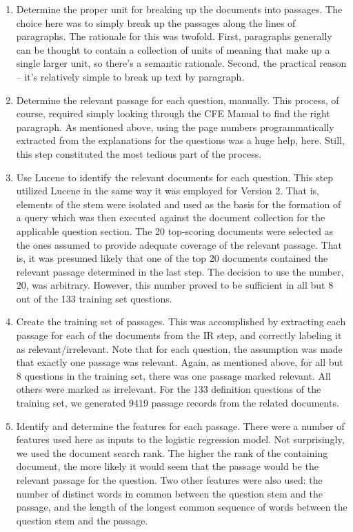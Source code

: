 \begin{enumerate}
\item Determine the proper unit for breaking up the documents into passages.  The choice here was to simply break up the passages along the lines of paragraphs.  The rationale for this was twofold.  First, paragraphs generally can be thought to contain a collection of units of meaning that make up a single larger unit, so there's a semantic rationale.  Second, the practical reason -- it's relatively simple to break up text by paragraph.

\item Determine the relevant passage for each question, manually.  This process, of course, required simply looking through the CFE Manual to find the right paragraph.  As mentioned above, using the page numbers programmatically extracted from the explanations for the questions was a huge help, here.  Still, this step constituted the most tedious part of the process.

\item Use Lucene to identify the relevant documents for each question.  This step utilized Lucene in the same way it was employed for Version 2.  That is, elements of the stem were isolated and used as the basis for the formation of a query which was then executed against the document collection for the applicable question section.  The 20 top-scoring documents were selected as the ones assumed to provide adequate coverage of the relevant passage.  That is, it was presumed likely that one of the top 20 documents contained the relevant passage determined in the last step.  The decision to use the number, 20, was arbitrary.  However, this number proved to be sufficient in all but 8 out of the 133 training set questions.  

\item Create the training set of passages.  This was accomplished by extracting each passage for each of the documents from the IR step, and correctly labeling it as relevant/irrelevant.  Note that for each question, the assumption was made that exactly one passage was relevant.  Again, as mentioned above, for all but 8 questions in the training set, there was one passage marked relevant.  All others were marked as irrelevant.  For the 133 definition questions of the training set, we generated 9419 passage records from the related documents.

\item Identify and determine the features for each passage.  There were a number of features used here as inputs to the logistic regression model.  Not surprisingly, we used the document search rank.  The higher the rank of the containing document, the more likely it would seem that the passage would be the relevant passage for the question.  Two other features were also used:  the number of distinct words in common between the question stem and the passage, and the length of the longest common sequence of words between the question stem and the passage.
\end{enumerate}

